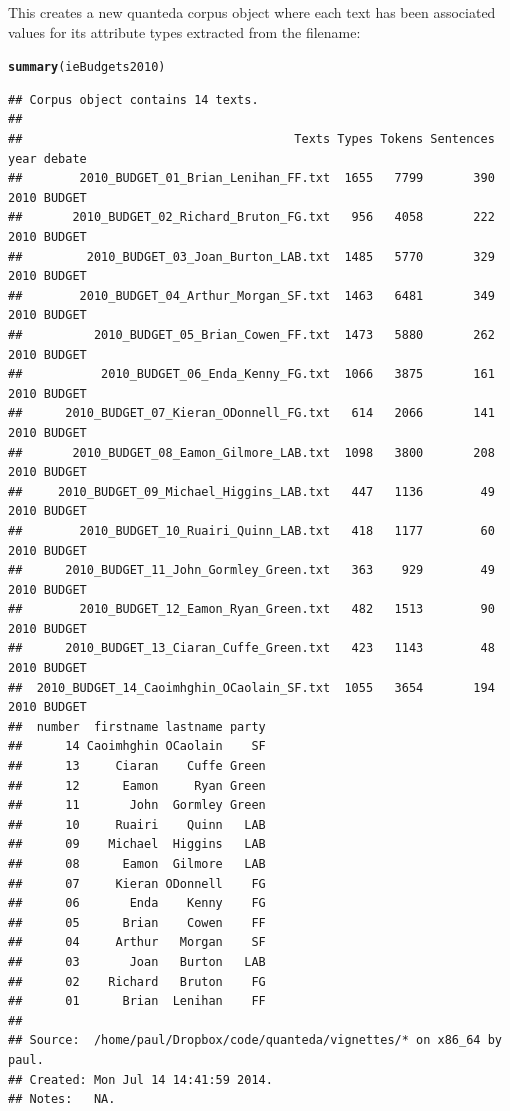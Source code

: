 \documentclass[11pt]{article}\usepackage[]{graphicx}\usepackage[]{color}
\makeatletter
\newcommand{\hlstd}[1]{\textcolor[rgb]{0.345,0.345,0.345}{#1}}%
\newcommand{\hlkwd}[1]{\textcolor[rgb]{0.737,0.353,0.396}{\textbf{#1}}}%
\newenvironment{kframe}{%
 \def\at@end@of@kframe{}%
 \ifinner\ifhmode%
  \def\at@end@of@kframe{\end{minipage}}%
  \begin{minipage}{\columnwidth}%
 \fi\fi%
 \def\FrameCommand##1{\hskip\@totalleftmargin \hskip-\fboxsep
 \colorbox{shadecolor}{##1}\hskip-\fboxsep
     \hskip-\linewidth \hskip-\@totalleftmargin \hskip\columnwidth}%
 \MakeFramed {\advance\hsize-\width
   \@totalleftmargin\z@ \linewidth\hsize
   \@setminipage}}%
 {\par\unskip\endMakeFramed%
 \at@end@of@kframe}
\newenvironment{knitrout}{}{} %
\makeatother
\begin{document}
This creates a new quanteda corpus object where each text has been associated values for its attribute types extracted from the filename:

\begin{knitrout}\footnotesize
{}\color{fgcolor}\begin{kframe}
\begin{alltt}
\hlkwd{summary}\hlstd{(ieBudgets2010)}
\end{alltt}
\begin{verbatim}
## Corpus object contains 14 texts.
## 
##                                      Texts Types Tokens Sentences year debate
##        2010_BUDGET_01_Brian_Lenihan_FF.txt  1655   7799       390 2010 BUDGET
##       2010_BUDGET_02_Richard_Bruton_FG.txt   956   4058       222 2010 BUDGET
##         2010_BUDGET_03_Joan_Burton_LAB.txt  1485   5770       329 2010 BUDGET
##        2010_BUDGET_04_Arthur_Morgan_SF.txt  1463   6481       349 2010 BUDGET
##          2010_BUDGET_05_Brian_Cowen_FF.txt  1473   5880       262 2010 BUDGET
##           2010_BUDGET_06_Enda_Kenny_FG.txt  1066   3875       161 2010 BUDGET
##      2010_BUDGET_07_Kieran_ODonnell_FG.txt   614   2066       141 2010 BUDGET
##       2010_BUDGET_08_Eamon_Gilmore_LAB.txt  1098   3800       208 2010 BUDGET
##     2010_BUDGET_09_Michael_Higgins_LAB.txt   447   1136        49 2010 BUDGET
##        2010_BUDGET_10_Ruairi_Quinn_LAB.txt   418   1177        60 2010 BUDGET
##      2010_BUDGET_11_John_Gormley_Green.txt   363    929        49 2010 BUDGET
##        2010_BUDGET_12_Eamon_Ryan_Green.txt   482   1513        90 2010 BUDGET
##      2010_BUDGET_13_Ciaran_Cuffe_Green.txt   423   1143        48 2010 BUDGET
##  2010_BUDGET_14_Caoimhghin_OCaolain_SF.txt  1055   3654       194 2010 BUDGET
##  number  firstname lastname party
##      14 Caoimhghin OCaolain    SF
##      13     Ciaran    Cuffe Green
##      12      Eamon     Ryan Green
##      11       John  Gormley Green
##      10     Ruairi    Quinn   LAB
##      09    Michael  Higgins   LAB
##      08      Eamon  Gilmore   LAB
##      07     Kieran ODonnell    FG
##      06       Enda    Kenny    FG
##      05      Brian    Cowen    FF
##      04     Arthur   Morgan    SF
##      03       Joan   Burton   LAB
##      02    Richard   Bruton    FG
##      01      Brian  Lenihan    FF
## 
## Source:  /home/paul/Dropbox/code/quanteda/vignettes/* on x86_64 by paul.
## Created: Mon Jul 14 14:41:59 2014.
## Notes:   NA.
\end{verbatim}
\end{kframe}
\end{knitrout}
\end{document}
